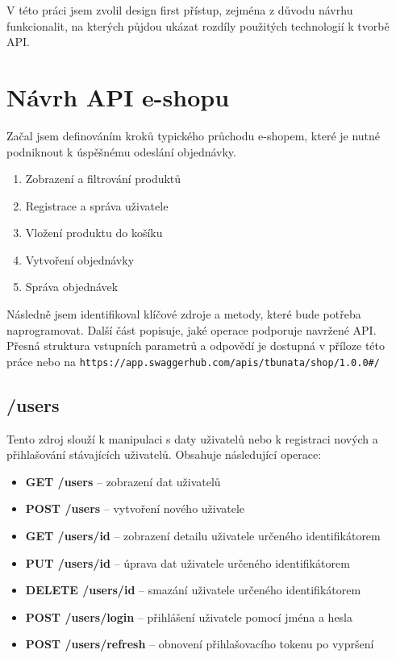 \documentclass[thesis=M,czech]{FITthesis}[2019/12/23]
\begin{document}
V této práci jsem zvolil design first přístup, zejména z důvodu návrhu funkcionalit, na kterých půjdou ukázat rozdíly použitých technologií k tvorbě API.

\section{Návrh API e-shopu}

Začal jsem definováním kroků typického průchodu e-shopem, které je nutné podniknout k úspěšnému odeslání objednávky.

\begin{enumerate}
  \item Zobrazení a filtrování produktů
  \item Registrace a správa uživatele
  \item Vložení produktu do košíku
  \item Vytvoření objednávky
  \item Správa objednávek
\end{enumerate}

Následně jsem identifikoval klíčové zdroje a metody, které bude potřeba naprogramovat. Další část popisuje, jaké operace podporuje navržené API. Přesná struktura vstupních parametrů a odpovědí je dostupná v příloze této práce nebo na \texttt{https://app.swaggerhub.com/apis/tbunata/shop/1.0.0#/}

\subsection{/users}
Tento zdroj slouží k manipulaci s daty uživatelů nebo k registraci nových a přihlašování stávajících uživatelů. Obsahuje následující operace:

\begin{itemize}
  \item \textbf{GET /users} -- zobrazení dat uživatelů
  \item \textbf{POST /users} -- vytvoření nového uživatele
  \item \textbf{GET /users/{id}} -- zobrazení detailu uživatele určeného identifikátorem
  \item \textbf{PUT /users/{id}} -- úprava dat uživatele určeného identifikátorem
  \item \textbf{DELETE /users/{id}} -- smazání uživatele určeného identifikátorem
  \item \textbf{POST /users/login} -- přihlášení uživatele pomocí jména a hesla
  \item \textbf{POST /users/refresh} -- obnovení přihlašovacího tokenu po vypršení
\end{itemize}
\end{document}
